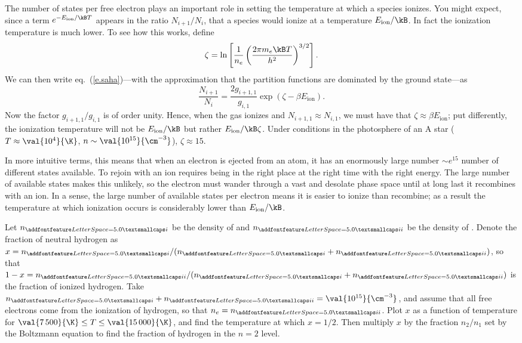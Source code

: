 The number of states per free electron plays an important role in setting the temperature at which a species ionizes. You might expect, since a term $e^{-E_{\mathrm{ion}}/\kB T}$ appears in the ratio $N_{i+1}/N_{i}$, that a species would ionize at a temperature $E_{\mathrm{ion}}/\kB$. In fact the ionization temperature is much lower. To see how this works, define
\[
	\zeta = \ln\left[\frac{1}{n_{e}}\left(\frac{2\pi m_{e}\kB T}{h^{2}}\right)^{3/2}\right].
\]
We can then write eq.~(\ref{e.saha})---with the approximation that the partition functions are dominated by the ground state---as
\[
	\frac{N_{i+1}}{N_{i}} = \frac{2g_{i+1,1}}{g_{i,1}}\exp\left(\zeta - \beta E_{\mathrm{ion}}\right).
\]
Now the factor $g_{i+1,1}/g_{i,1}$ is of order unity. Hence, when the gas ionizes and $N_{i+1,1}\approx N_{i,1}$, we must have that $\zeta\approx \beta E_{\mathrm{ion}}$; put differently, the ionization temperature will not be $E_{\mathrm{ion}}/\kB$ but rather $E_{\mathrm{ion}}/\kB\zeta$. Under conditions in the photosphere of an A star ($T \approx \val{10^{4}}{\K}$, $n\sim \val{10^{15}}{\cm^{-3}}$), $\zeta \approx 15$.

In more intuitive terms, this means that when an electron is ejected from an atom, it has an enormously large number $\sim e^{15}$ number of different states available. To rejoin with an ion requires being in the right place at the right time with the right energy. The large number of available states makes this unlikely, so the electron must wander through a vast and desolate phase space until at long last it recombines with an ion. In a sense, the large number of available states per electron means it is easier to ionize than recombine; as a result the temperature at which ionization occurs is considerably lower than $E_{\mathrm{ion}}/\kB$.

\begin{exercisebox}
\label{ex.strong-Balmer}
Let $n_{\textsc{i}}$ be the density of  and $n_{\textsc{ii}}$ be the density of . Denote the fraction of neutral hydrogen as $x = n_{\textsc{i}}/(n_{\textsc{i}}+n_{\textsc{ii}})$, so that $1-x = n_{\textsc{ii}}/(n_{\textsc{i}}+n_{\textsc{ii}})$ is the fraction of ionized hydrogen. Take $n_{\textsc{i}}+n_{\textsc{ii}} = \val{10^{15}}{\cm^{-3}}$, and assume that all free electrons come from the ionization of hydrogen, so that $n_{e} = n_{\textsc{ii}}$. Plot $x$ as a function of temperature for $\val{7\,500}{\K}\le T\le \val{15\,000}{\K}$, and find the temperature at which $x = 1/2$. Then multiply $x$ by the fraction $n_{2}/n_{1}$ set by the Boltzmann equation to find the fraction of hydrogen in the $n=2$ level.
\end{exercisebox}

